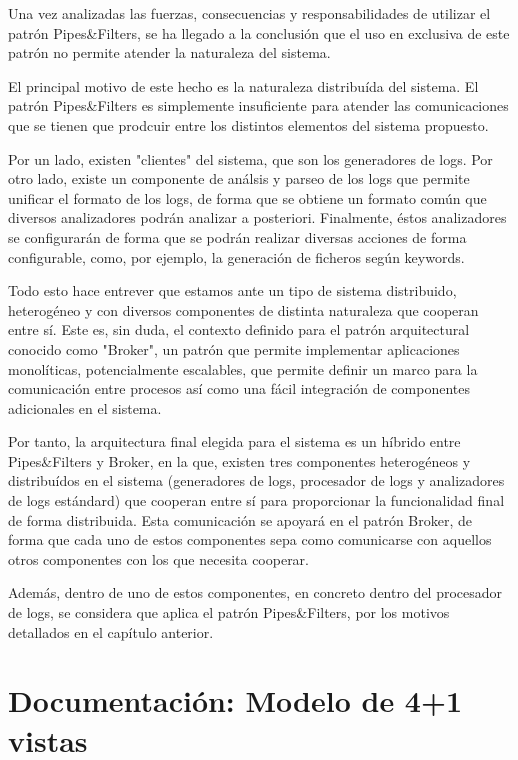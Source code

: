 \documentclass[11pt]{article}
\begin{document}
Una vez analizadas las fuerzas, consecuencias y responsabilidades de utilizar el patrón Pipes\&Filters, se ha llegado a la conclusión que el uso en exclusiva de este patrón no permite atender la naturaleza del sistema.

El principal motivo de este hecho es la naturaleza distribuída del sistema. El patrón Pipes\&Filters es simplemente insuficiente para atender las comunicaciones que se tienen que prodcuir entre los distintos elementos del sistema propuesto.

Por un lado, existen "clientes" del sistema, que son los generadores de logs. Por otro lado, existe un componente de análsis y parseo de los logs que permite unificar el formato de los logs, de forma que se obtiene un formato común que diversos analizadores podrán analizar a posteriori. Finalmente, éstos analizadores se configurarán de forma que se podrán realizar diversas acciones de forma configurable, como, por ejemplo, la generación de ficheros según keywords.

Todo esto hace entrever que estamos ante un tipo de sistema distribuido, heterogéneo y con diversos componentes de distinta naturaleza que cooperan entre sí. Este es, sin duda, el contexto definido para el patrón arquitectural conocido como "Broker", un patrón que permite implementar aplicaciones monolíticas, potencialmente escalables, que permite definir un marco para la comunicación entre procesos así como una fácil integración de componentes adicionales en el sistema.

Por tanto, la arquitectura final elegida para el sistema es un híbrido entre Pipes\&Filters y Broker, en la que, existen tres componentes heterogéneos y distribuídos en el sistema (generadores de logs, procesador de logs y analizadores de logs estándard) que cooperan entre sí para proporcionar la funcionalidad final de forma distribuida. Esta comunicación se apoyará en el patrón Broker, de forma que cada uno de estos componentes sepa como comunicarse con aquellos otros componentes con los que necesita cooperar.

Además, dentro de uno de estos componentes, en concreto dentro del procesador de logs, se considera que aplica el patrón Pipes\&Filters, por los motivos detallados en el capítulo anterior.

\pagebreak

\section{Documentación: Modelo de 4+1 vistas}
\end{document}

